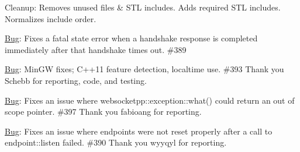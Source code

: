 \begin{DoxyItemize}
\item Cleanup\+: Removes unused files \& S\+TL includes. Adds required S\+TL includes. Normalizes include order.
\item \mbox{\hyperlink{struct_bug}{Bug}}\+: Fixes a fatal state error when a handshake response is completed immediately after that handshake times out. \#389
\item \mbox{\hyperlink{struct_bug}{Bug}}\+: Min\+GW fixes; C++11 feature detection, localtime use. \#393 Thank you Schebb for reporting, code, and testing.
\item \mbox{\hyperlink{struct_bug}{Bug}}\+: Fixes an issue where {\ttfamily websocketpp\+::exception\+::what()} could return an out of scope pointer. \#397 Thank you fabioang for reporting.
\item \mbox{\hyperlink{struct_bug}{Bug}}\+: Fixes an issue where endpoints were not reset properly after a call to {\ttfamily endpoint\+::listen} failed. \#390 Thank you wyyqyl for reporting.
\end{DoxyItemize}

